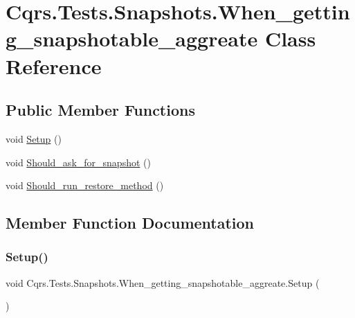 \hypertarget{classCqrs_1_1Tests_1_1Snapshots_1_1When__getting__snapshotable__aggreate}{}\section{Cqrs.\+Tests.\+Snapshots.\+When\+\_\+getting\+\_\+snapshotable\+\_\+aggreate Class Reference}
\label{classCqrs_1_1Tests_1_1Snapshots_1_1When__getting__snapshotable__aggreate}
\subsection*{Public Member Functions}
\begin{DoxyCompactItemize}
\item 
void \hyperlink{classCqrs_1_1Tests_1_1Snapshots_1_1When__getting__snapshotable__aggreate_a4f25b49d955c717d0ddbef37c662bfb4_a4f25b49d955c717d0ddbef37c662bfb4}{Setup} ()
\item 
void \hyperlink{classCqrs_1_1Tests_1_1Snapshots_1_1When__getting__snapshotable__aggreate_ab56b6055ea95703fa4c10ae31205191b_ab56b6055ea95703fa4c10ae31205191b}{Should\+\_\+ask\+\_\+for\+\_\+snapshot} ()
\item 
void \hyperlink{classCqrs_1_1Tests_1_1Snapshots_1_1When__getting__snapshotable__aggreate_adec6028129afb8fe11a3069d3d3aa956_adec6028129afb8fe11a3069d3d3aa956}{Should\+\_\+run\+\_\+restore\+\_\+method} ()
\end{DoxyCompactItemize}


\subsection{Member Function Documentation}
\mbox{\label{classCqrs_1_1Tests_1_1Snapshots_1_1When__getting__snapshotable__aggreate_a4f25b49d955c717d0ddbef37c662bfb4_a4f25b49d955c717d0ddbef37c662bfb4}} 
\subsubsection{\texorpdfstring{Setup()}{Setup()}}
{\footnotesize\ttfamily void Cqrs.\+Tests.\+Snapshots.\+When\+\_\+getting\+\_\+snapshotable\+\_\+aggreate.\+Setup (\begin{DoxyParamCaption}{ }\end{DoxyParamCaption})}

